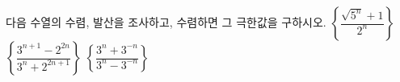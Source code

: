 다음 수열의 수렴, 발산을 조사하고, 수렴하면 그 극한값을 구하시오.
 $\left\{\dfrac{\sqrt{5^n}+1}{2^n}\right\}$
 $\left\{\dfrac{3^{n+1}-2^{2n}}{3^n+2^{2n+1}}\right\}$
 $\left\{\dfrac{3^n+3^{-n}}{3^n-3^{-n}}\right\}$
